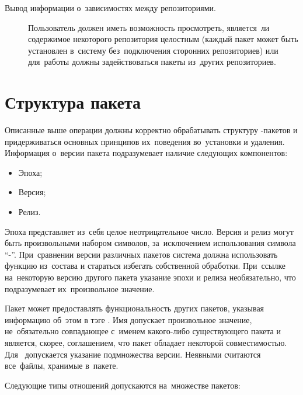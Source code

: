 \begin{description}
\item[Вывод информации о~зависимостях между репозиториями.]
Пользователь должен иметь возможность просмотреть, 
является~ли содержимое некоторого репозитория целостным (каждый пакет может быть установлен в~систему без~подключения сторонних репозиториев)
или для~работы должны задействоваться пакеты из~других репозиториев. 

\end{description}

\section{Структура пакета}
\label{pkgstruct}

Описанные выше операции должны корректно обрабатывать структуру -пакетов и 
придерживаться основных принципов их~поведения во~установки и удаления.
Информация о~версии пакета подразумевает наличие следующих компонентов:

\begin{itemize}
\item {Эпоха;}
\item{Версия;}
\item {Релиз.}
\end{itemize}

Эпоха представляет из~себя целое неотрицательное число. 
Версия и релиз могут быть произвольными набором символов, за~исключением использования символа ``-''.
При~сравнении версии различных пакетов система должна использовать функцию  из~состава 
и стараться избегать собственной обработки. 
При~ссылке на~некоторую версию другого пакета указание эпохи и релиза необязательно,
что подразумевает их~произвольное значение.

Пакет может предоставлять функциональность других пакетов,
указывая информацию об~этом в тэге .
Имя  допускает произвольное значение, не~обязательно совпадающее с~именем какого-либо существующего пакета
и является, скорее, соглашением, что пакет обладает некоторой совместимостью.
Для~  допускается указание подмножества версии.
Неявными  считаются все~файлы, хранимые в~пакете.

Следующие типы отношений допускаются на~множестве пакетов:

